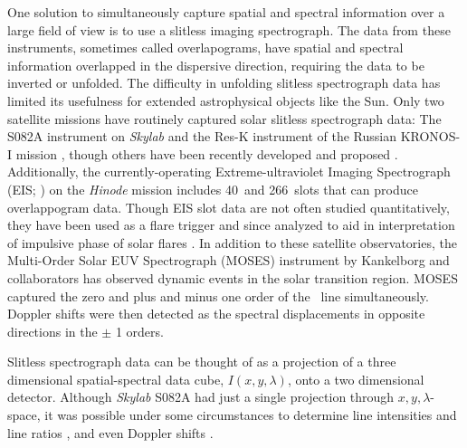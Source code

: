 \documentclass[linenumbers,trackchanges]{aastex63}
\begin{document}
    One solution to simultaneously capture spatial and spectral information over a large field of view is to use a slitless imaging spectrograph.  
    The data from these instruments, sometimes called overlapograms, have spatial and spectral information overlapped in the dispersive direction, requiring the data to be inverted or unfolded.
    The difficulty in unfolding slitless spectrograph data has limited its usefulness for extended astrophysical objects like the Sun. 
    Only two satellite missions have routinely captured solar slitless spectrograph data: The S082A instrument on {\it Skylab} \citep{Tousey1973} and the Res-K instrument of the Russian KRONOS-I mission \citep{Zhitnik1998}, though others have been recently developed and proposed \citep{winebarger2019,golub2020}. 
    Additionally, the currently-operating Extreme-ultraviolet Imaging Spectrograph (EIS; \citet{culhane2007}) on the {\it Hinode} mission \citep{kosugi2007} includes 40\arcsec\ and 266\arcsec\ slots that can produce overlappogram data.
    Though EIS slot data are not often studied quantitatively, they have been used as a flare trigger and since analyzed to aid in interpretation of impulsive phase of solar flares \citep{harra2017,harra2020}.
    In addition to these satellite observatories,  the Multi-Order Solar EUV Spectrograph (MOSES) instrument by Kankelborg and collaborators \citep{Kankelborg01,Fox2010,Rust2019} has observed dynamic events in the solar transition region.
    MOSES captured the zero and plus and minus one order of the \heii \ line simultaneously. 
    Doppler shifts were then detected as the spectral displacements in opposite directions in the $\pm$ 1 orders.
    
    Slitless spectrograph data can be thought of as a projection of a three dimensional spatial-spectral data cube, $I(x,y,\lambda)$, onto a two dimensional detector.  
    Although {\it Skylab} S082A had just a single projection through $x,y,\lambda$-space, it was possible under some circumstances to determine line intensities and line ratios \cite[e.g.,][]{Keenan1988, Tayal1989, Keenan2006}, and even Doppler shifts \citep{MariskaDoppler1992}. 
\end{document}

